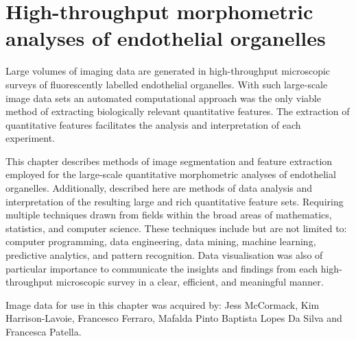 \chapter{High-throughput morphometric analyses of endothelial organelles}
\label{endothelial_morphometry}
\ifpdf
	\graphicspath{{chapter_2/figs/}}
\fi


Large volumes of imaging data are generated in high-throughput microscopic surveys of fluorescently labelled endothelial organelles. With such large-scale image data sets an automated computational approach was the only viable method of extracting biologically relevant quantitative features. The extraction of quantitative features facilitates the analysis and interpretation of each experiment.

This chapter describes methods of image segmentation and feature extraction employed for the large-scale quantitative morphometric analyses of endothelial organelles. Additionally, described here are methods of data analysis and interpretation of the resulting large and rich quantitative feature sets. Requiring multiple techniques drawn from fields within the broad areas of mathematics, statistics, and computer science. These techniques include but are not limited to: computer programming, data engineering, data mining, machine learning, predictive analytics, and pattern recognition. Data visualisation was also of particular importance to communicate the insights and findings from each high-throughput microscopic survey in a clear, efficient, and meaningful manner.

Image data for use in this chapter was acquired by: Jess McCormack, Kim Harrison-Lavoie, Francesco Ferraro, Mafalda Pinto Baptista Lopes Da Silva and Francesca Patella.

